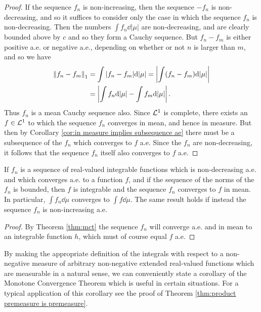 \begin{proof}
If the sequence $f_n$ is non-increasing, then the sequence $-f_n$ is non-decreasing, and so it suffices to consider only the case in which the sequence $f_n$ is non-decreasing. Then the numbers $\int f_n\dd|\mu|$ are non-decreasing, and are clearly bounded above by $c$ and so they form a Cauchy sequence. But $f_n-f_m$ is either positive a.e. or negative a.e., depending on whether or not $n$ is larger than $m$, and so we have \begin{align*}
    \norm{f_n-f_m}_1&=\int|f_n-f_m|\dd|\mu|=\left\lvert\int(f_n-f_m)\dd|\mu|\right\rvert\\
    &=\left\lvert\int f_n\dd|\mu|-\int f_m\dd|\mu|\right\rvert.
\end{align*} Thus $f_n$ is a mean Cauchy sequence also. Since ${\cal L}^1$ is complete, there exists an $f\in{\cal L}^1$ to which the sequence $f_n$ converges in mean, and hence in measure. But then by Corollary \ref{cor:in measure implies subsequence ae} there must be a subsequence of the $f_n$ which converges to $f$ a.e. Since the $f_n$ are non-decreasing, it follows that the sequence $f_n$ itself also converges to $f$ a.e.
\end{proof}

\begin{corollary}
\label{cor:mct}
If $f_n$ is a sequence of real-valued integrable functions which is non-decreasing a.e. and which converges a.e. to a function $f$, and if the sequence of the norms of the $f_n$ is bounded, then $f$ is integrable and the sequence $f_n$ converges to $f$ in mean. In particular, $\int f_n\dd\mu$ converges to $\int f\dd\mu$. The same result holds if instead the sequence $f_n$ is non-increasing a.e.
\end{corollary} 

\begin{proof}
By Theorem \ref{thm:mct} the sequence $f_n$ will converge a.e. and in mean to an integrable function $h$, which must of course equal $f$ a.e.
\end{proof}

By making the appropriate definition of the integrals with respect to a non-negative measure of arbitrary non-negative extended real-valued functions which are measurable in a natural sense, we can conveniently state a corollary of the Monotone Convergence Theorem which is useful in certain situations. For a typical application of this corollary see the proof of Theorem \ref{thm:product premeasure is premeasure}.

